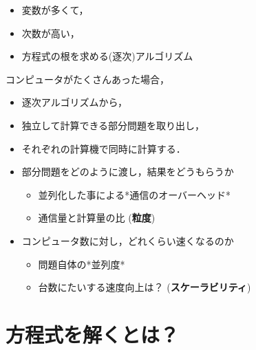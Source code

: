 \documentclass[a4j,12pt]{jarticle}
\author{Masayuki Suzuki}
\date{\today}
\title{}
\begin{document}
\maketitle
\tableofcontents

\begin{itemize}
\item 変数が多くて，

\item 次数が高い，

\item 方程式の根を求める(逐次)アルゴリズム
\end{itemize}

コンピュータがたくさんあった場合，

\begin{itemize}
\item 逐次アルゴリズムから，

\item 独立して計算できる部分問題を取り出し，

\item それぞれの計算機で同時に計算する．

\item 部分問題をどのように渡し，結果をどうもらうか

\begin{itemize}
\item 並列化した事による*通信のオーバーヘッド*

\item 通信量と計算量の比 (\textbf{粒度})
\end{itemize}

\item コンピュータ数に対し，どれくらい速くなるのか

\begin{itemize}
\item 問題自体の*並列度*

\item 台数にたいする速度向上は？ (\textbf{スケーラビリティ})
\end{itemize}
\end{itemize}

\section{方程式を解くとは？}
\label{sec:orge98fe38}
\end{document}
